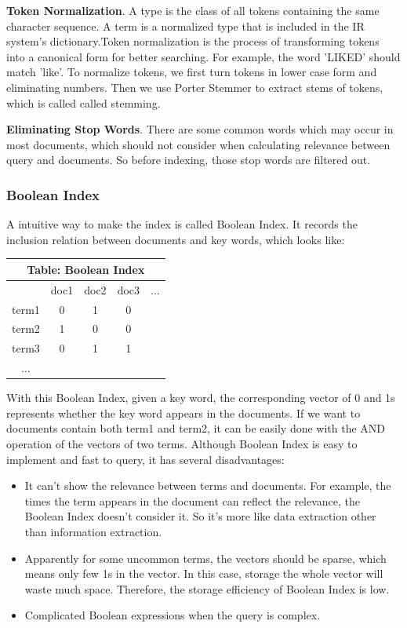 \documentclass[10pt,journal,compsoc]{IEEEtran}
\begin{document}
\textbf{Token Normalization}. A type is the class of all tokens containing the same character sequence. A term is a normalized type that is included in the IR system's dictionary.Token normalization is the process of transforming tokens into a canonical form for better searching. For example, the word 'LIKED' should match 'like'. To normalize tokens, we first turn tokens in lower case form and eliminating numbers. Then we use Porter Stemmer to extract stems of tokens, which is called called stemming.

\textbf{Eliminating Stop Words}. There are some common words which may occur in most documents, which should not consider when calculating relevance between query and documents. So before indexing, those stop words are filtered out.


\subsubsection{Boolean Index}
A intuitive way to make the index is called Boolean Index. It records the inclusion relation between documents and key words, which looks like:
\begin{table}[H]
\centering
\begin{tabular}{ccccc}
\toprule
\multicolumn{5}{c}{\textbf{Table: Boolean Index}} \\
\midrule
 & doc1   & doc2 & doc3 & ...        \\
term1 & 0 & 1 & 0 &             \\
term2 & 1 & 0 & 0 &             \\
term3 & 0 & 1 & 1 &             \\
... & & & \\
\bottomrule
\end{tabular}
\end{table}
With this Boolean Index, given a key word, the corresponding vector of 0 and 1s represents whether the key word appears in the documents. If we want to documents contain both term1 and term2, it can be easily done with the AND operation of the vectors of two terms. Although Boolean Index is easy to implement and fast to query, it has several disadvantages:
\begin{itemize}
    \item It can't show the relevance between terms and documents. For example, the times the term appears in the document can reflect the relevance, the Boolean Index doesn't consider it. So it's more like data extraction other than information extraction.
    \item Apparently for some uncommon terms, the vectors should be sparse, which means only few 1s in the vector. In this case, storage the whole vector will waste much space. Therefore, the storage efficiency of Boolean Index is low.
    \item Complicated Boolean expressions when the query is complex. 
\end{itemize}
\end{document}
